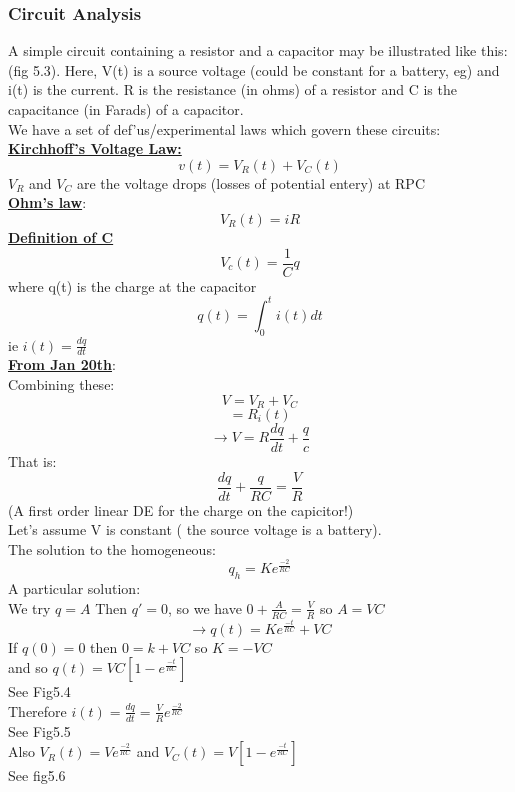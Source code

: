 \documentclass[12pt]{article}
\newcommand{\myt}[1]{\textbf{\underline{#1}}}
\begin{document}
	\subsubsection*{Circuit Analysis}
	A simple circuit containing a resistor and a capacitor may be illustrated like this: (fig 5.3). Here, V(t) is a source voltage (could be constant for a battery, eg) and i(t) is the current. R is the resistance (in ohms) of a resistor and C is the capacitance (in Farads) of a capacitor.\\
	
	We have a set of def'us/experimental laws which govern these circuits:\\
	\myt{Kirchhoff's Voltage Law:}\\
	$$v(t) = V_R(t) + V_C(t)$$
	$V_R$ and $V_C$ are the voltage drops (losses of potential entery) at RPC\\
	\myt{Ohm's law}:\\
	$$V_R(t) = iR$$
	\myt{Definition of C}\\
	$$V_c(t) = \frac{1}{C}q$$
	where q(t) is the charge at the capacitor\\
	$$q(t) = \int_{0}^{t}i(t)dt$$
	ie $i(t) = \frac{dq}{dt}$\\
	
	\myt{From Jan 20th}:\\
	Combining these:\\
	$$V = V_R + V_C$$
	$$= R_i(t)$$
	$$\rightarrow V = R\frac{dq}{dt} + \frac{q}{c}$$
	That is:\\
	$$\frac{dq}{dt} + \frac{q}{RC} = \frac{V}{R}$$
	(A first order linear DE for the charge on the capicitor!)\\
	Let's assume V is constant ( the source voltage is a battery).\\
	The solution to the homogeneous:\\
	$$q_h = Ke^{\frac{-2}{RC}}$$
	A particular solution:\\
	We try $q = A$ Then $q' = 0$, so we have $0 + \frac{A}{RC} = \frac{V}{R}$ so $A = VC$\\
	
	$$\rightarrow q(t) = Ke^{\frac{-t}{RC}} + VC$$
	If $q(0) = 0$ then $0 = k + VC$ so $K = -VC$\\
	and so $q(t) = VC[1 - e^{\frac{-t}{RC}}]$\\
	
	See Fig5.4\\
	Therefore $i(t) = \frac{dq}{dt} = \frac{V}{R}e^{\frac{-2}{RC}}$\\
	See Fig5.5\\
	
	Also $V_R(t) = Ve^{\frac{-2}{RC}}$ and $V_C(t) = V[1-e^{\frac{-t}{RC}}]$\\
	See fig5.6\\
	
\end{document}
